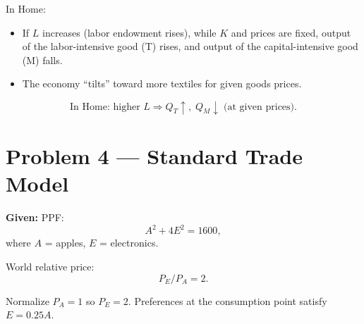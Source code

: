 \documentclass[12pt]{article}
\begin{document}
\begin{enumerate}[label=(\arabic*)]
In Home:

\begin{itemize}
\item If $L$ increases (labor endowment rises), while $K$ and prices are fixed, output of the labor-intensive good (T) rises, and output of the capital-intensive good (M) falls.
\item The economy ``tilts'' toward more textiles for given goods prices.
\end{itemize}

\[
\boxed{\text{In Home: higher $L$} \Rightarrow Q_T \uparrow,\; Q_M \downarrow \;\text{(at given prices).}}
\]

\end{enumerate}

\section*{Problem 4 — Standard Trade Model}

\textbf{Given:} PPF:
\[
A^2 + 4E^2 = 1600,
\]
where $A$ = apples, $E$ = electronics.

World relative price:
\[
P_E/P_A = 2.
\]

Normalize $P_A=1$ so $P_E=2$. Preferences at the consumption point satisfy $E = 0.25A$.
\end{document}
